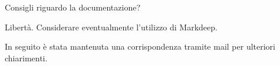 \begin{spacing}{3}
\end{spacing}

\begin{minipage}[c]{0.47\textwidth}
\centering
Consigli riguardo la documentazione?
\end{minipage}
\hfill
\begin{minipage}[c]{0.47\textwidth}
\centering
Libertà. Considerare eventualmente l’utilizzo di Markdeep.
\end{minipage}

\begin{spacing}{2}
\end{spacing}

In seguito è stata mantenuta una corrispondenza tramite mail per ulteriori chiarimenti.
